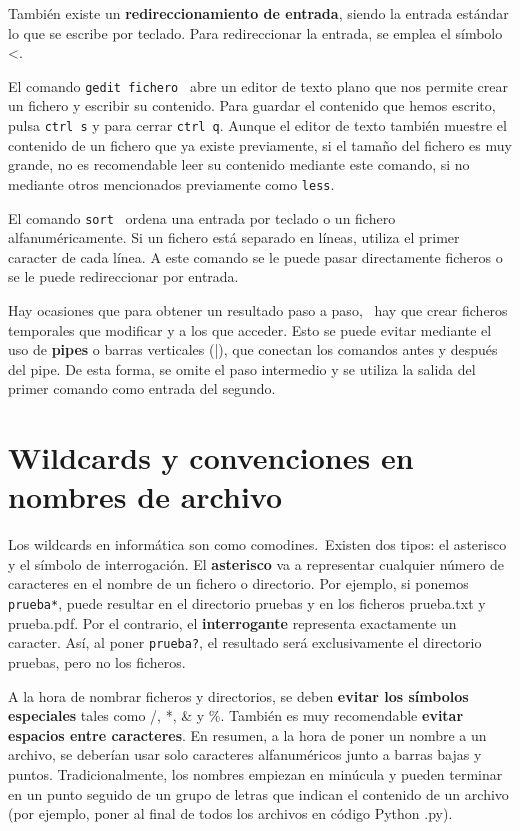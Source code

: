 \documentclass{config/apuntes}
\begin{document}
También existe un \textbf{redireccionamiento de entrada}, siendo la entrada estándar lo que se escribe por teclado. Para redireccionar la entrada, se emplea el símbolo <.  \marginpar[\footnotesize <] \ 

El comando \texttt{gedit fichero}  \ abre un editor de texto plano que nos permite crear un fichero y escribir su contenido. Para guardar el contenido que hemos escrito, pulsa \texttt{ctrl s} y para cerrar \texttt{ctrl q}. Aunque el editor de texto también muestre el contenido de un fichero que ya existe previamente, si el tamaño del fichero es muy grande, no es recomendable leer su contenido mediante este comando, si no mediante otros mencionados previamente como \texttt{less}.

El comando \texttt{sort}  \ ordena una entrada por teclado o un fichero alfanuméricamente. Si un fichero está separado en líneas, utiliza el primer caracter de cada línea. A este comando se le puede pasar directamente ficheros o se le puede redireccionar por entrada.

Hay ocasiones que para obtener un resultado paso a paso,  \marginpar[\footnotesize |] \ hay que crear ficheros temporales que modificar y a los que acceder. Esto se puede evitar mediante el uso de \textbf{pipes} o barras verticales (|), que conectan los comandos antes y después del pipe. De esta forma, se omite el paso intermedio y se utiliza la salida del primer comando como entrada del segundo. 

\section{Wildcards y convenciones en nombres de archivo}
Los wildcards en informática son como comodines.\marginpar[\footnotesize * \\ ?] \ Existen dos tipos: el asterisco y el símbolo de interrogación. El \textbf{asterisco} va a representar cualquier número de caracteres en el nombre de un fichero o directorio. Por ejemplo, si ponemos \texttt{prueba*}, puede resultar en el directorio pruebas y en los ficheros prueba.txt y prueba.pdf. Por el contrario, el \textbf{interrogante} representa exactamente un caracter. Así, al poner \texttt{prueba?}, el resultado será exclusivamente el directorio pruebas, pero no los ficheros.

A la hora de nombrar ficheros y directorios, se deben \textbf{evitar los símbolos especiales} tales como /, *, \& y \%. También es muy recomendable \textbf{evitar espacios entre caracteres}. En resumen, a la hora de poner un nombre a un archivo, se deberían usar solo caracteres alfanuméricos junto a barras bajas y puntos. Tradicionalmente, los nombres empiezan en minúcula y pueden terminar en un punto seguido de un grupo de letras que indican el contenido de un archivo (por ejemplo, poner al final de todos los archivos en código Python .py).
\end{document}
